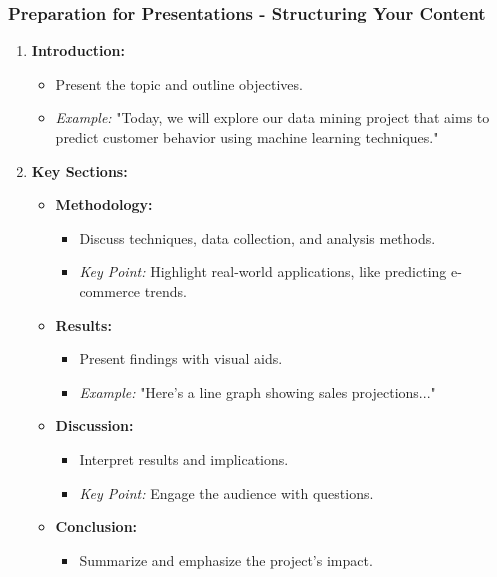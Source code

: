 \documentclass[aspectratio=169]{beamer}
\begin{document}
\begin{frame}[fragile]
    \frametitle{Preparation for Presentations - Structuring Your Content}
    \begin{enumerate}
        \item \textbf{Introduction:}
            \begin{itemize}
                \item Present the topic and outline objectives. 
                \item \textit{Example:} "Today, we will explore our data mining project that aims to predict customer behavior using machine learning techniques."
            \end{itemize}
        
        \item \textbf{Key Sections:}
            \begin{itemize}
                \item \textbf{Methodology:} 
                    \begin{itemize}
                        \item Discuss techniques, data collection, and analysis methods.
                        \item \textit{Key Point:} Highlight real-world applications, like predicting e-commerce trends.
                    \end{itemize}
                \item \textbf{Results:} 
                    \begin{itemize}
                        \item Present findings with visual aids.
                        \item \textit{Example:} "Here’s a line graph showing sales projections..."
                    \end{itemize}
                \item \textbf{Discussion:} 
                    \begin{itemize}
                        \item Interpret results and implications.
                        \item \textit{Key Point:} Engage the audience with questions.
                    \end{itemize}
                \item \textbf{Conclusion:} 
                    \begin{itemize}
                        \item Summarize and emphasize the project’s impact.
                    \end{itemize}
            \end{itemize}
    \end{enumerate}
\end{frame}
\end{document}
